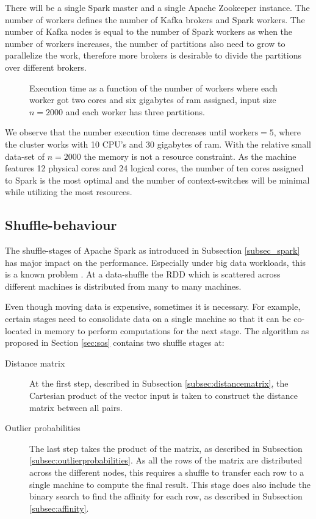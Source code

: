 There will be a single Spark master and a single Apache Zookeeper instance. The number of workers defines the number of Kafka brokers and Spark workers. The number of Kafka nodes is equal to the number of Spark workers as when the number of workers increases, the number of partitions also need to grow to parallelize the work, therefore more brokers is desirable to divide the partitions over different brokers.

\begin{figure}[ht!]
    \begin{center}
        
        \caption[Execution time as a function of workers.]{Execution time as a function of the number of workers where each worker got two cores and six gigabytes of ram assigned, input size $n=2000$ and each worker has three partitions.}
        \label{fig:parallelization}
    \end{center}
\end{figure}

We observe that the number execution time decreases until $\text{workers} = 5$, where the cluster works with 10 CPU's and 30 gigabytes of ram. With the relative small data-set of $n=2000$ the memory is not a resource constraint. As the machine features 12 physical cores and 24 logical cores, the number of ten cores assigned to Spark is the most optimal and the number of context-switches will be minimal while utilizing the most resources.

\subsection{Shuffle-behaviour \label{subsec:shuffle-behaviour}}

The shuffle-stages of Apache Spark as introduced in Subsection \ref{subsec_spark} has major impact on the performance. Especially under big data workloads, this is a known problem \cite{Chen:2009:UTI:1592681.1592693}. At a data-shuffle the RDD which is scattered across different machines is distributed from many to many machines. 

Even though moving data is expensive, sometimes it is necessary. For example, certain stages need to consolidate data on a single machine so that it can be co-located in memory to perform computations for the next stage. The algorithm as proposed in Section \ref{sec:sos} contains two shuffle stages at:
\begin{description}
  \item[Distance matrix] At the first step, described in Subsection \ref{subsec:distancematrix}, the Cartesian product of the vector input is taken to construct the distance matrix between all pairs.
  \item[Outlier probabilities] The last step takes the product of the matrix, as described in Subsection \ref{subsec:outlierprobabilities}. As all the rows of the matrix are distributed across the different nodes, this requires a shuffle to transfer each row to a single machine to compute the final result. This stage does also include the binary search to find the affinity for each row, as described in Subsection \ref{subsec:affinity}.
\end{description}

